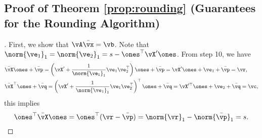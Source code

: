 \subsection{Proof of Theorem \ref{prop:rounding} (Guarantees for the Rounding Algorithm)}
\begin{proof}[\unskip \nopunct]
    First, we show that $\vA \Bar{\vx} = \vb$. Note that $\norm{\ve_1}_1 = \norm{\ve_2}_1 = s - \ones^\top \vX' \ones$. From step 10, we have
    \begin{align*}
        &\Bar{\vX} \ones + \bar{\vp} = \left(\vX' + \dfrac{1}{\norm{\ve_1}_1} \ve_1 \ve_2^\top \right) \ones + \bar{\vp} = \vX' \ones + \ve_1 + \bar{\vp}= \vr, \\
        &\Bar{\vX}^\top \ones + \bar{\vq}= \left(\vX' + \dfrac{1}{\norm{\ve_1}_1} \ve_1 \ve_2^\top \right)^\top \ones + \bar{\vq}= \vX'^\top \ones + \ve_2 + \bar{\vq}= \vc,
    \end{align*}
    this implies
    \begin{equation*}
        \ones^\top \Bar{\vX} \ones = \ones^\top (\vr - \bar{\vp}) = \norm{\vr}_1 - \norm{\bar{\vp}}_1 = s.
    \end{equation*}


\end{proof}
